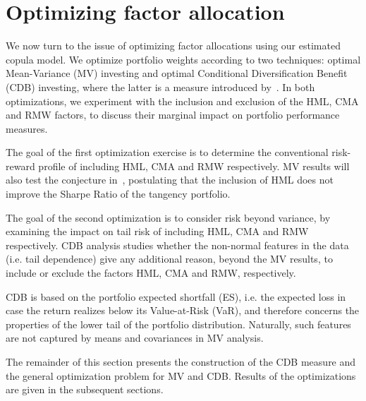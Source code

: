
\section{Optimizing factor allocation} %
\label{sec:optimizing_factor_allocations}

We now turn to the issue of optimizing factor allocations using our estimated copula model. We optimize portfolio weights according to two techniques: optimal Mean-Variance (MV) investing and optimal Conditional Diversification Benefit (CDB) investing, where the latter is a measure introduced by~\textcite{ChristoffersenErrunzaJacobLanglois2012}. In both optimizations, we experiment with the inclusion and exclusion of the HML, CMA and RMW factors, to discuss their marginal impact on portfolio performance measures.

The goal of the first optimization exercise is to determine the conventional risk-reward profile of including HML, CMA and RMW respectively. MV results will also test the conjecture in~\textcite{FF2015}, postulating that the inclusion of HML does not improve the Sharpe Ratio of the tangency portfolio. 

The goal of the second optimization is to consider risk beyond variance, by examining the impact on tail risk of including HML, CMA and RMW respectively. CDB analysis studies whether the non-normal features in the data (i.e. tail dependence) give any additional reason, beyond the MV results, to include or exclude the factors HML, CMA and RMW, respectively.

CDB is based on the portfolio expected shortfall (ES), i.e. the expected loss in case the return realizes below its Value-at-Risk (VaR), and therefore concerns the properties of the lower tail of the portfolio distribution. Naturally, such features are not captured by means and covariances in MV analysis.

The remainder of this section presents the construction of the CDB measure and the general optimization problem for MV and CDB. Results of the optimizations are given in the subsequent sections.


